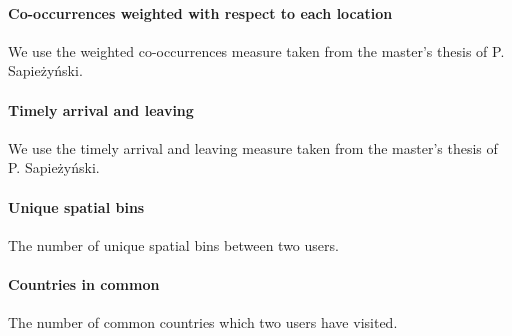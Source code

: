 \paragraph{Co-occurrences weighted with respect to each location}
We use the weighted co-occurrences measure taken from the master's thesis of P. Sapieżyński\cite{IMM2013-06556}.

\paragraph{Timely arrival and leaving}
We use the timely arrival and leaving measure taken from the master's thesis of P. Sapieżyński\cite{IMM2013-06556}.

\paragraph{Unique spatial bins}
The number of unique spatial bins between two users.

\paragraph{Countries in common}
The number of common countries which two users have visited.

\subsection{}